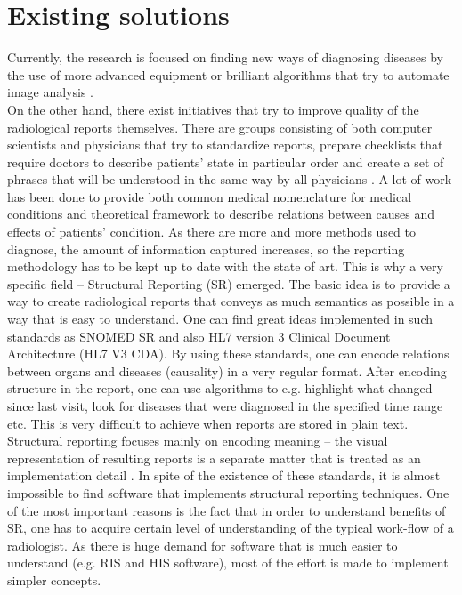 \documentclass[12pt, twoside, openany]{report}
\theoremstyle{definition}
\begin{document}
\section{Existing solutions}
Currently, the research is focused on finding new ways of diagnosing diseases by  the use of more advanced equipment or brilliant algorithms that try to automate image analysis \cite{ai}. \\
On the other hand, there exist initiatives that try to improve quality of the radiological reports themselves. There are groups consisting of both computer scientists and physicians that try to standardize reports, prepare checklists that require doctors to describe patients' state in particular order and create a set of phrases that will be understood in the same way by all physicians \cite{snomed}. A lot of work has been done to provide both common medical nomenclature for medical conditions and theoretical framework to describe relations between causes and effects of patients' condition. As there are more and more methods used to diagnose, the amount of information captured increases, so the reporting methodology has to be kept up to date with the state of art. This is why a very specific field -- Structural Reporting (SR) emerged. The basic idea is to provide a way to create radiological reports that conveys as much semantics as possible in a way that is easy to understand. One can find great ideas implemented in such standards as SNOMED SR \cite{sr} and also HL7 version 3 Clinical Document Architecture (HL7 V3 CDA). By using these standards, one can encode relations between organs and diseases (causality) in a very regular format. After encoding structure in the report, one can use algorithms to e.g. highlight what changed since last visit, look for diseases that were diagnosed in the specified time range etc. This is very difficult to achieve when reports are stored in plain text. Structural reporting focuses mainly on encoding meaning -- the visual representation of resulting reports is a separate matter that is treated as an implementation detail \cite{sr}.
In spite of the existence of these standards, it is almost impossible to find software that implements structural reporting techniques. One of the most important reasons is the fact that in order to understand benefits of SR, one has to acquire certain level of understanding of the typical work-flow of a radiologist. As there is huge demand for software that is much easier to understand (e.g. RIS and HIS software), most of the effort is made to implement simpler concepts.
\end{document}
